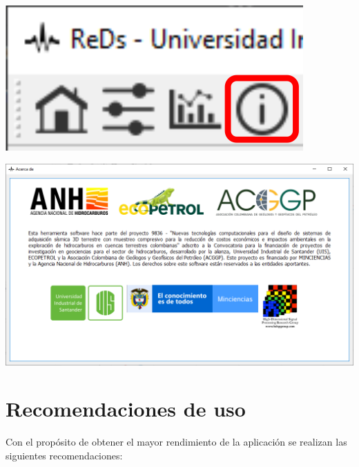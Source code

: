 \documentclass[12pt,twoside,letter]{ol-softwaremanual}
\newenvironment{Figure}
  {\par\medskip\noindent\minipage{\linewidth}}
  {\endminipage\par\medskip}
\begin{document}
\begin{Figure}
    \centering
    \includegraphics[width=0.25\linewidth]{about-tab.png}
    \label{fig:about_tab}
\end{Figure}

\begin{Figure}
    \centering
    \includegraphics[width=1\linewidth]{about.png}
    \label{fig:about_of}
\end{Figure}

\section{Recomendaciones de uso}

Con el propósito de obtener el mayor rendimiento de la aplicación se realizan las siguientes recomendaciones:
\end{document}
